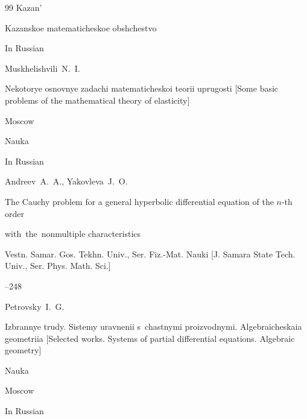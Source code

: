 \begin{thebibliography}{99}
\publaddr Kazan'

\publ Kazanskoe matematicheskoe obshchestvo 







\lang In Russian

\by Muskhelishvili~N.~I.

\book Nekotorye osnovnye zadachi matematicheskoi teorii uprugosti  \rm [Some basic problems of the mathematical theory of elasticity]

\publaddr Moscow

\publ Nauka








\lang In Russian

\by Andreev~A.~A., Yakovleva~J.~O.

\paper The Cauchy problem for a general hyperbolic differential equation of the $n$-th order

with~the~nonmultiple characteristics

\jour Vestn. Samar. Gos. Tekhn. Univ., Ser. Fiz.-Mat. Nauki \rm [J. Samara State Tech. Univ., Ser. Phys. Math. Sci.]




--248





\by Petrovsky~I.~G.

\book Izbrannye trudy. Sistemy uravnenii s~chastnymi proizvodnymi. Algebraicheskaia geometriia \rm [Selected works. Systems of partial differential equations. Algebraic geometry]


\publ Nauka

\publaddr Moscow


\lang In Russian






\end{thebibliography}
